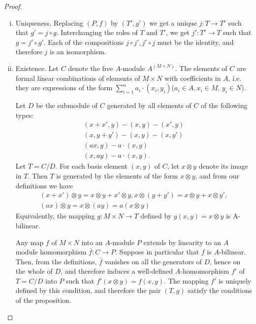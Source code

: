 \documentclass{standalone}
\theoremstyle{definition}
\theoremstyle{remark}
\begin{document}
\begin{proof}
  \begin{enumerate}[i)]
  \item Uniqueness. Replacing $(P, f)$ by $(T', g')$ we get a
unique $j\colon T \to T'$ such that $g'=j \circ g$. Interchanging the roles of $T$
and $T'$, we get $j'\colon T' \to T$ such that $g=j' \circ g'$. Each of the
compositions $j \circ j', j' \circ j$ must be the identity, and therefore $j$ is
an isomorphism.
\item Existence. Let $C$ denote the free $A$-module $A^{(M \times N)}$. The
elements of $C$ are formal linear combinations of elements of $M \times N$ with
coefficients in $A$, i.e. they are expressions of the form
$\sum_{i=1}^{n} a_{i} \cdot(x_{i}, y_{i})$($a_{i} \in A, x_{i} \in M$, $y_{i} \in N$).

Let $D$ be the submodule of $C$ generated by all elements of $C$ of the
following types:
\[
  \begin{gathered}
    (x+x', y)-(x, y)-(x', y) \\
    (x, y+y')-(x, y)-(x, y') \\
    (a x, y)-a \cdot(x, y) \\
    (x, a y)-a \cdot(x, y) .
  \end{gathered}
\]
Let $T=C / D$. For each basis element $(x, y)$ of $C$, let $x \otimes y$ denote
its image in $T$. Then $T$ is generated by the elements of the form
$x \otimes y$, and from our definitions we have
\[
  \begin{gathered}
    (x+x') \otimes y=x \otimes y+x' \otimes y, x \otimes(y+y')=x \otimes y+x \otimes y', \\
    (a x) \otimes y=x \otimes(a y)=a(x \otimes y)
  \end{gathered}
\]
Equivalently, the mapping $g\colon M \times N \to T$ defined by $g(x, y)=x \otimes y$
is A-bilinear.

Any map $f$ of $M \times N$ into an $A$-module $P$ extends by linearity to an
$A$ module homomorphism $\bar{f}\colon C \to P$. Suppose in particular that $f$ is
$A$-bilinear. Then, from the definitions, $\bar{f}$ vanishes on all the generators of
$D$, hence on the whole of $D$, and therefore induces a well-defined
$A$-homomorphism $f'$ of $T=C / D$ into $P$ such that $f'(x \otimes y)=f(x, y)$.
The mapping $f'$ is uniquely defined by this condition, and therefore the pair
$(T, g)$ satisfy the conditions of the proposition.
\end{enumerate}
\end{proof}
\end{document}
